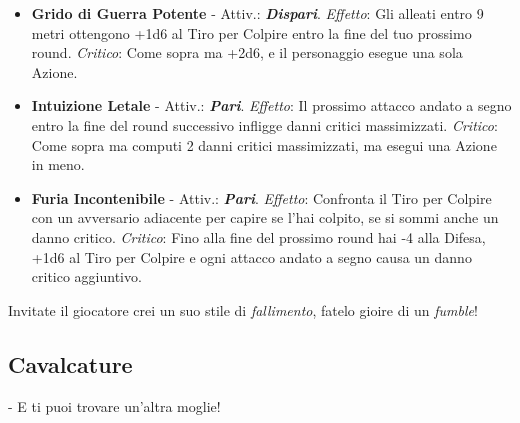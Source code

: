 \begin{multicols}{2}
\begin{itemize}[leftmargin=*]
\begin{itemize}[leftmargin=*]
		\item \textbf{Grido di Guerra Potente} - Attiv.: \textbf{\emph{Dispari}}. \emph{Effetto}: Gli alleati entro 9 metri ottengono +1d6 al Tiro per Colpire entro la fine del tuo prossimo round. \emph{Critico}: Come sopra ma +2d6, e il personaggio esegue una sola Azione.

		\item \textbf{Intuizione Letale} - Attiv.: \textbf{\emph{Pari}}. \emph{Effetto}: Il prossimo attacco andato a segno entro la fine del round successivo infligge danni critici massimizzati. \emph{Critico}: Come sopra ma computi 2 danni critici massimizzati, ma esegui una Azione in meno.

		\item \textbf{Furia Incontenibile} - Attiv.: \textbf{\emph{Pari}}. \emph{Effetto}: Confronta il Tiro per Colpire con un avversario adiacente per capire se l'hai colpito, se si sommi anche un danno critico. \emph{Critico}: Fino alla fine del prossimo round hai -4 alla Difesa, +1d6 al Tiro per Colpire e ogni attacco andato a segno causa un danno critico aggiuntivo.
	\end{itemize}

\end{itemize}

%
%


\begin{changemargin}{0.3cm}{0.3cm}\begin{narratore}
		Invitate il giocatore crei un suo stile di \emph{fallimento}, fatelo gioire di un \emph{fumble}!
\end{narratore}\end{changemargin}


%

\subsection{Cavalcature}\label{cavalcature}\hypertarget{cavalcare}{}\label{cavalcare}

\begin{changemargin}{0.3cm}{0.3cm}\begin{enfasi}{
- E ti puoi trovare un'altra moglie!

}
\end{enfasi}
\end{changemargin}
\end{multicols}
